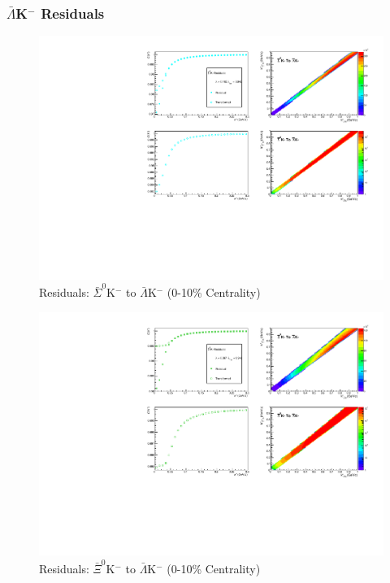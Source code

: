 \documentclass[../AnalysisNoteJBuxton.tex]{subfiles}
\begin{document}
\subsubsection{\texorpdfstring{$\bar{\Lambda}$K$^{-}$}{TEXT} Residuals}
\label{Residuals_ALamKchM}

\begin{figure}[h]
  \centering
  \includegraphics[width=\textwidth]{9_AdditionalFigures/Figures/Residuals/ALamKchM/Residuals_ALamKchM_0010_ASig0KchM_MomResCrctn_NonFlatBgdCrctn_ResidualsIncluded_UsingCoulombOnlyInterpCfs.pdf}
  \caption[Residuals: $\bar{\Sigma}^{0}$K$^{-}$ to $\bar{\Lambda}$K$^{-}$ (0-10\% Centrality)]{Residuals: $\bar{\Sigma}^{0}$K$^{-}$ to $\bar{\Lambda}$K$^{-}$ (0-10\% Centrality)}
  \label{fig:Res_ALamKchM_0010_ASig0KchM}
\end{figure}

\begin{figure}[h]
  \centering
  \includegraphics[width=\textwidth]{9_AdditionalFigures/Figures/Residuals/ALamKchM/Residuals_ALamKchM_0010_AXi0KchM_MomResCrctn_NonFlatBgdCrctn_ResidualsIncluded_UsingCoulombOnlyInterpCfs.pdf}
  \caption[Residuals: $\bar{\Xi}^{0}$K$^{-}$ to $\bar{\Lambda}$K$^{-}$ (0-10\% Centrality)]{Residuals: $\bar{\Xi}^{0}$K$^{-}$ to $\bar{\Lambda}$K$^{-}$ (0-10\% Centrality)}
  \label{fig:Res_ALamKchM_0010_AXi0KchM}
\end{figure}
\end{document}
